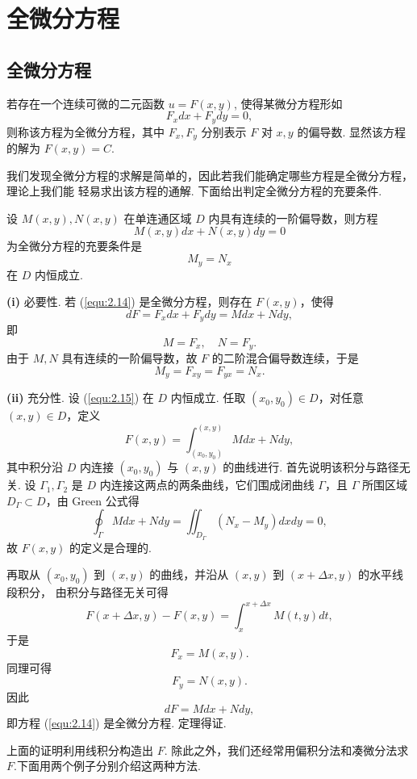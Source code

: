 \section{全微分方程}\label{sec:2.3}
\subsection{全微分方程}
若存在一个连续可微的二元函数 $u=F(x,y)$, 使得某微分方程形如
\[
F_xdx+F_ydy=0,
\]
则称该方程为全微分方程，其中 $F_x,F_y$ 分别表示 $F$ 对 $x,y$ 的偏导数. 显然该方程的解为 $F(x,y)=C$.

我们发现全微分方程的求解是简单的，因此若我们能确定哪些方程是全微分方程，理论上我们能
轻易求出该方程的通解. 下面给出判定全微分方程的充要条件.
\begin{thm}\label{thm:2.3.1}
设 $M(x,y),N(x,y)$ 在单连通区域 $D$ 内具有连续的一阶偏导数，则方程
\begin{equation}\label{equ:2.14}
M(x,y)dx+N(x,y)dy=0
\end{equation}
为全微分方程的充要条件是
\begin{equation}\label{equ:2.15}
M_y=N_x
\end{equation}
在 $D$ 内恒成立.
\end{thm}
\begin{pf1}
\textbf{(i)} 必要性. 若 (\ref{equ:2.14}) 是全微分方程，则存在 $F(x,y)$，使得
\[
dF=F_xdx+F_ydy=Mdx+Ndy,
\]
即
\[
M=F_x,\quad N=F_y.
\]
由于 $M,N$ 具有连续的一阶偏导数，故 $F$ 的二阶混合偏导数连续，于是
\[
M_y=F_{xy}=F_{yx}=N_x.
\]

\textbf{(ii)} 充分性. 设 (\ref{equ:2.15}) 在 $D$ 内恒成立. 任取 $(x_0,y_0)\in D$，对任意 $(x,y)\in D$，定义
\[
F(x,y)=\int_{(x_0,y_0)}^{(x,y)}Mdx+Ndy,
\]
其中积分沿 $D$ 内连接 $(x_0,y_0)$ 与 $(x,y)$ 的曲线进行. 首先说明该积分与路径无关. 设
$\Gamma_1,\Gamma_2$ 是 $D$ 内连接这两点的两条曲线，它们围成闭曲线 $\Gamma$，且 $\Gamma$ 所围区域
$D_\Gamma\subset D$，由 Green 公式得
\[
\oint_{\Gamma}Mdx+Ndy=\iint_{D_\Gamma}\left(N_x-M_y\right)dxdy=0,
\]
故 $F(x,y)$ 的定义是合理的.

再取从 $(x_0,y_0)$ 到 $(x,y)$ 的曲线，并沿从 $(x,y)$ 到 $(x+\Delta x,y)$ 的水平线段积分，
由积分与路径无关可得
\[
F(x+\Delta x,y)-F(x,y)=\int_{x}^{x+\Delta x}M(t,y)dt,
\]
于是
\[
F_x=M(x,y).
\]
同理可得
\[
F_y=N(x,y).
\]
因此
\[
dF=Mdx+Ndy,
\]
即方程 (\ref{equ:2.14}) 是全微分方程. 定理得证.
\end{pf1}

上面的证明利用线积分构造出 $F$. 除此之外，我们还经常用偏积分法和凑微分法求 $F$.下面用两个例子分别介绍这两种方法.

